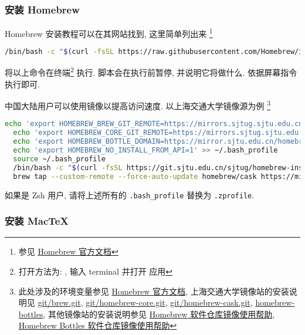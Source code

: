 \subsubsection{安装 Homebrew}

Homebrew 安装教程可以在其网站找到,
这里简单列出来%
\footnote{参见 \href{https://docs.brew.sh/Installation\#git-remote-mirroring}{Homebrew 官方文档}}
\begin{lstlisting}[language=bash]
  /bin/bash -c "$(curl -fsSL https://raw.githubusercontent.com/Homebrew/install/HEAD/install.sh)"
\end{lstlisting}
将以上命令在\textsf{终端}\footnote{%
  打开方法为: \keys{\cmdmac + \SPACE}, 输入 \textsf{terminal} 并打开  应用}%
执行.
脚本会在执行前暂停, 并说明它将做什么. 依据屏幕指令执行即可.

中国大陆用户可以使用镜像以提高访问速度.
以上海交通大学镜像源为例%
\footnote{此处涉及的环境变量参见 \href{https://docs.brew.sh/Manpage\#environment}{Homebrew 官方文档},
上海交通大学镜像站的安装说明见
\href{https://mirrors.sjtug.sjtu.edu.cn/docs/git/brew.git}{git/brew.git},
\href{https://mirrors.sjtug.sjtu.edu.cn/docs/git/homebrew-core.git}{git/homebrew-core.git},
\href{https://mirrors.sjtug.sjtu.edu.cn/docs/git/homebrew-cask.git}{git/homebrew-cask.git},
\href{https://mirrors.sjtug.sjtu.edu.cn/docs/homebrew-bottles}{homebrew-bottles},
其他镜像站的安装说明参见
\href{https://help.mirrors.cernet.edu.cn/homebrew/}{Homebrew 软件仓库镜像使用帮助},
\href{https://help.mirrors.cernet.edu.cn/homebrew-bottles/}{Homebrew Bottles 软件仓库镜像使用帮助}}
\begin{lstlisting}[language=bash]
  echo 'export HOMEBREW_BREW_GIT_REMOTE=https://mirrors.sjtug.sjtu.edu.cn/git/brew.git' >> ~/.bash_profile
  echo 'export HOMEBREW_CORE_GIT_REMOTE=https://mirrors.sjtug.sjtu.edu.cn/git/homebrew-core.git' >> ~/.bash_profile
  echo 'export HOMEBREW_BOTTLE_DOMAIN=https://mirror.sjtu.edu.cn/homebrew-bottles/bottles' >> ~/.bash_profile
  echo 'export HOMEBREW_NO_INSTALL_FROM_API=1' >> ~/.bash_profile
  source ~/.bash_profile
  /bin/bash -c "$(curl -fsSL https://git.sjtu.edu.cn/sjtug/homebrew-install/-/raw/master/install.sh)"
  brew tap --custom-remote --force-auto-update homebrew/cask https://mirrors.sjtug.sjtu.edu.cn/git/homebrew-cask.git
\end{lstlisting}
如果是 Zsh 用户, 请将上述所有的 \texttt{.bash\_profile} 替换为 \texttt{.zprofile}.

\subsubsection{安装 Mac\TeX}

